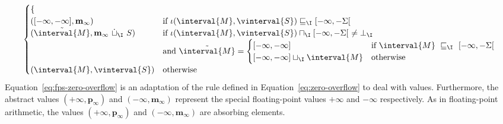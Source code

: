 {\begin{equation}
\begin{cases}
\begin{cases}
      \end{cases}
      \\
      ([-\infty, -\infty], \text{\textbf{m}}_\infty) 
      & \text{if } \iota(\interval{M}, \vinterval{S}) \sqsubseteq_\I
      [-\infty, -\Sigma[
      \\
      (\tilde{\interval{M}}, 
      \text{\textbf{m}}_\infty\ \dot{\sqcup}_\I\ S) & \text{if }
      \iota(\interval{M}, \vinterval{S})
      \sqcap_\I [-\infty, -\Sigma[\ \neq \bot_\I
      \\
      & \text{and }\tilde{\interval{M}} =
      \begin{cases}
        [-\infty, -\infty] & \text{if } 
        \interval{M}\ \sqsubseteq_\I\ [-\infty, -\Sigma[
        \\
[-\infty,-\infty] \sqcup_\I \interval{M} & \text{otherwise}
      \end{cases}
      \\
      (\interval{M}, \vinterval{S}) & \text{otherwise}
    \end{cases}
  \end{equation}
}Equation~\eqref{eq:fps-zero-overflow} is an adaptation of the rule
defined in Equation~\eqref{eq:zero-overflow} to deal with \fps
values. Furthermore, the abstract values $(+\infty,
\mathbf{p}_\infty)$ and $(-\infty, \mathbf{m}_\infty)$ represent the
special floating-point values $+\infty$ and $-\infty$ respectively. As
in floating-point arithmetic, the values $(+\infty,
\mathbf{p}_\infty)$ and $(-\infty, \mathbf{m}_\infty)$ are absorbing
elements.

